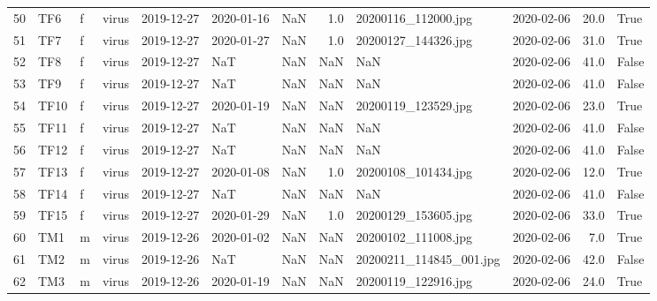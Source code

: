 \begin{longtable}{llllllrrllrl}
50 &    TF6 &   f &      virus &   2019-12-27 & 2020-01-16 &               NaN &                  1.0 &      20200116\_112000.jpg &        2020-02-06 &  20.0 &   True \\
51 &    TF7 &   f &      virus &   2019-12-27 & 2020-01-27 &               NaN &                  1.0 &      20200127\_144326.jpg &        2020-02-06 &  31.0 &   True \\
52 &    TF8 &   f &      virus &   2019-12-27 &        NaT &               NaN &                  NaN &                      NaN &        2020-02-06 &  41.0 &  False \\
53 &    TF9 &   f &      virus &   2019-12-27 &        NaT &               NaN &                  NaN &                      NaN &        2020-02-06 &  41.0 &  False \\
54 &   TF10 &   f &      virus &   2019-12-27 & 2020-01-19 &               NaN &                  NaN &      20200119\_123529.jpg &        2020-02-06 &  23.0 &   True \\
55 &   TF11 &   f &      virus &   2019-12-27 &        NaT &               NaN &                  NaN &                      NaN &        2020-02-06 &  41.0 &  False \\
56 &   TF12 &   f &      virus &   2019-12-27 &        NaT &               NaN &                  NaN &                      NaN &        2020-02-06 &  41.0 &  False \\
57 &   TF13 &   f &      virus &   2019-12-27 & 2020-01-08 &               NaN &                  1.0 &      20200108\_101434.jpg &        2020-02-06 &  12.0 &   True \\
58 &   TF14 &   f &      virus &   2019-12-27 &        NaT &               NaN &                  NaN &                      NaN &        2020-02-06 &  41.0 &  False \\
59 &   TF15 &   f &      virus &   2019-12-27 & 2020-01-29 &               NaN &                  1.0 &      20200129\_153605.jpg &        2020-02-06 &  33.0 &   True \\
60 &    TM1 &   m &      virus &   2019-12-26 & 2020-01-02 &               NaN &                  NaN &      20200102\_111008.jpg &        2020-02-06 &   7.0 &   True \\
61 &    TM2 &   m &      virus &   2019-12-26 &        NaT &               NaN &                  NaN &  20200211\_114845\_001.jpg &        2020-02-06 &  42.0 &  False \\
62 &    TM3 &   m &      virus &   2019-12-26 & 2020-01-19 &               NaN &                  NaN &      20200119\_122916.jpg &        2020-02-06 &  24.0 &   True \\

\end{longtable}
